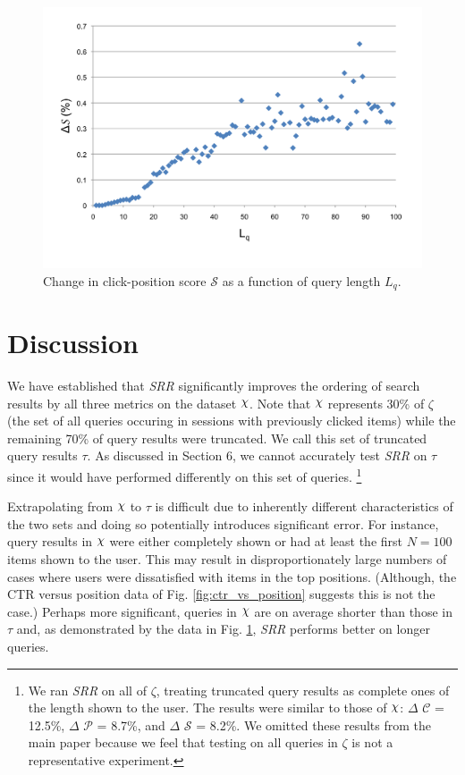 \documentclass{article}
\def\Chi{\raisebox{2pt}{$\chi$}}
\begin{document}
\begin{figure}[htbp!]
    \centering
    \includegraphics[width=\textwidth]{scorebylen.png}
    \caption{Change in click-position score $\mathscr{S}$ as a function of query length $L_q$.}
    \label{fig:click_position_score_vs_query_length}
\end{figure}

\section{Discussion}

We have established that {\em SRR} significantly improves the ordering
of search results by all three metrics on the dataset $\Chi$. Note that $\Chi$
represents 30\% of $\zeta$ (the set of all queries occuring in sessions with
previously clicked items) while the remaining 70\% of query results were truncated. 
We call this set of truncated query results $\tau$. As discussed in Section 6, 
we cannot accurately test {\em SRR} on $\tau$ since it would have performed 
differently on this set of queries. \footnote{We ran {\em SRR} on all of
$\zeta$, treating truncated query results as complete ones of the length shown to the
user.  The results were similar to those of $\Chi$:
$\Delta$ $\mathscr{C}$ = 12.5\%, $\Delta$ $\mathscr{P}$ = 8.7\%, and $\Delta$
$\mathscr{S}$ = 8.2\%. We omitted these results from the main paper because we
feel that testing on all queries in $\zeta$ is not a representative experiment.}

Extrapolating from $\Chi$ to $\tau$ is difficult due to inherently different
characteristics of the two sets and doing so potentially introduces significant
error. For instance, query results in $\Chi$ were either completely shown or
had at least the first $N=100$ items shown to the user. This may result in
disproportionately large numbers of cases where users were dissatisfied with
items in the top positions. (Although, the CTR versus position data of Fig.
\ref{fig:ctr_vs_position} suggests this is not the case.) Perhaps more
significant, queries in $\Chi$ are on average shorter than those in $\tau$ and,
as demonstrated by the data in Fig.
\ref{fig:click_position_score_vs_query_length}, {\em SRR} performs better on
longer queries. 
\end{document}
